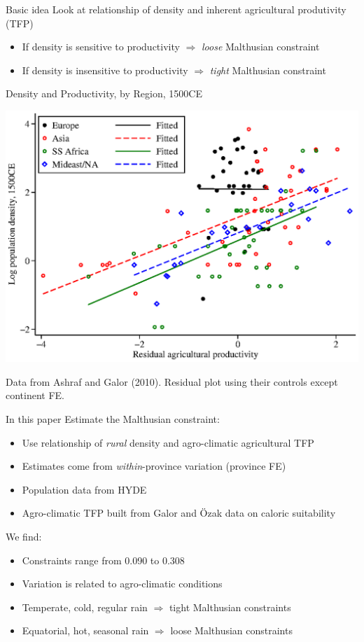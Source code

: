 \documentclass[10pt, xcolor=dvipsnames]{beamer}
\begin{document}
\begin{frame}{Basic idea}
Look at relationship of density and inherent agricultural produtivity (TFP)
\begin{itemize}
  \item If density is sensitive to productivity $\Rightarrow$ \textit{loose} Malthusian constraint
  \item If density is insensitive to productivity $\Rightarrow$ \textit{tight} Malthusian constraint
\end{itemize}

\end{frame}

\begin{frame}{Density and Productivity, by Region, 1500CE}
\begin{center}
\includegraphics[width=.8\textwidth]{fig_ag_regions.eps}
\end{center}
{\scriptsize Data from Ashraf and Galor (2010). Residual plot using their controls except continent FE.}
\end{frame}


\begin{frame}{In this paper}
Estimate the Malthusian constraint:
\begin{itemize}
  \item Use relationship of \textit{rural} density and agro-climatic agricultural TFP
  \item Estimates come from \textit{within}-province variation (province FE)
  \item Population data from HYDE
  \item Agro-climatic TFP built from Galor and {\"O}zak data on caloric suitability
\end{itemize}

\vspace{.2cm} We find:
\begin{itemize}
  \item Constraints range from 0.090 to 0.308
  \item Variation is related to agro-climatic conditions
  \item Temperate, cold, regular rain $\Rightarrow$ tight Malthusian constraints
  \item Equatorial, hot, seasonal rain $\Rightarrow$ loose Malthusian constraints
\end{itemize}

\end{frame}
\end{document}
